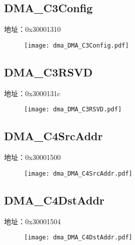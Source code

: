 \subsection{DMA\_C3Config}
\label{dma-DMA-C3Config}
地址：0x30001310
 \begin{figure}[H]
\texttt{[image: dma\_DMA\_C3Config.pdf]}
\end{figure}

\subsection{DMA\_C3RSVD}
\label{dma-DMA-C3RSVD}
地址：0x3000131c
 \begin{figure}[H]
\texttt{[image: dma\_DMA\_C3RSVD.pdf]}
\end{figure}

\subsection{DMA\_C4SrcAddr}
\label{dma-DMA-C4SrcAddr}
地址：0x30001500
 \begin{figure}[H]
\texttt{[image: dma\_DMA\_C4SrcAddr.pdf]}
\end{figure}

\subsection{DMA\_C4DstAddr}
\label{dma-DMA-C4DstAddr}
地址：0x30001504
 \begin{figure}[H]
\texttt{[image: dma\_DMA\_C4DstAddr.pdf]}
\end{figure}

